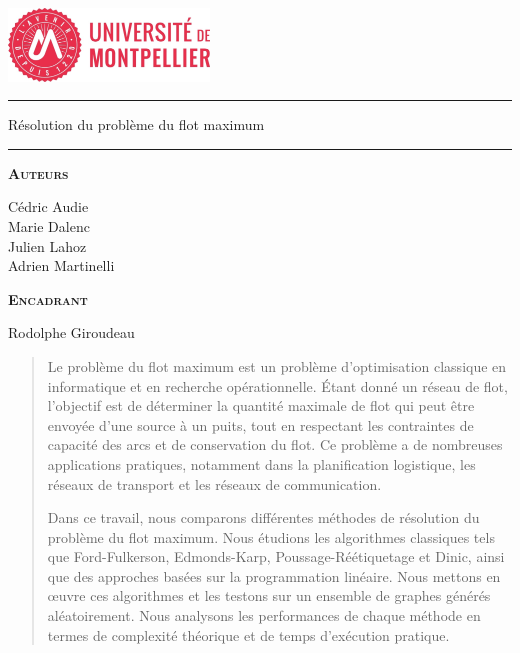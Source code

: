\documentclass[a4paper]{article}
\begin{document}
\begin{center}
\vspace{2cm}
\includegraphics[width=0.4\textwidth]{UM1.jpg}~\\[1cm]
\vspace{2cm}

\hrule
\vspace{.5cm}
{\huge\bfseries{Résolution du problème du flot maximum\par}} %
\vspace{.5cm}

\hrule
\vspace{1.5cm}

\textsc{\textbf{Auteurs}}\\
\vspace{.5cm}
\centering

Cédric Audie\\
Marie Dalenc\\
Julien Lahoz\\
Adrien Martinelli


\vspace{1cm}

\textsc{\textbf{Encadrant}}\\
\vspace{.5cm}
\centering

Rodolphe Giroudeau

\vspace{4cm}

\centering {} %
\end{center}
\newpage
\begin{abstract}	
Le problème du flot maximum est un problème d'optimisation classique en informatique et en recherche opérationnelle. Étant donné un réseau de flot, l'objectif est de déterminer la quantité maximale de flot qui peut être envoyée d'une source à un puits, tout en respectant les contraintes de capacité des arcs et de conservation du flot. Ce problème a de nombreuses applications pratiques, notamment dans la planification logistique, les réseaux de transport et les réseaux de communication. 

Dans ce travail, nous comparons différentes méthodes de résolution du problème du flot maximum.  Nous étudions les algorithmes classiques tels que Ford-Fulkerson, Edmonds-Karp, Poussage-Réétiquetage et Dinic, ainsi que des approches basées sur la programmation linéaire. Nous mettons en œuvre ces algorithmes et les testons sur un ensemble de graphes générés aléatoirement. Nous analysons les performances de chaque méthode en termes de complexité théorique et de temps d'exécution pratique. 
\end{abstract}
\newpage
{\hypersetup{hidelinks}
\tableofcontents
}
\newpage
\pagestyle{headings}
\end{document}
